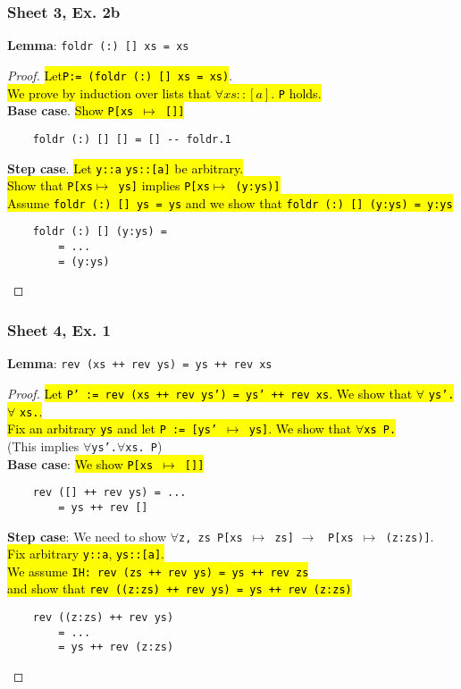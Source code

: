 \documentclass[12pt]{article}
\def\li{\rightarrow}
\begin{document}
\subsubsection{Sheet 3, Ex. 2b}
\textbf{Lemma}: \texttt{foldr (:) [] xs = xs}
\begin{proof}
    \hl{Let\texttt{P:= (foldr (:) [] xs = xs)}}. \\
    \hl{We prove by induction over lists that $\forall xs::[a].$ \texttt{P} holds.} \\
    \textbf{Base case}. \hl{Show \texttt{P[xs $\mapsto$ []]} }
    \begin{verbatim}
    foldr (:) [] [] = [] -- foldr.1
    \end{verbatim}
    \textbf{Step case}. \hl{Let \texttt{y::a} \texttt{ys::[a]} be arbitrary. \\
    Show that \texttt{P[xs$\mapsto$ ys]} implies \texttt{P[xs$\mapsto$ (y:ys)]} \\
    Assume \texttt{foldr (:) [] ys = ys} and we show that \texttt{foldr (:) [] (y:ys) = y:ys}}
    \begin{verbatim}
    foldr (:) [] (y:ys) = 
        = ...
        = (y:ys)
    \end{verbatim}
\end{proof}
\subsubsection{Sheet 4, Ex. 1}
\textbf{Lemma}: \texttt{rev (xs ++ rev ys) = ys ++ rev xs}
\begin{proof}
    \hl{Let \texttt{P' := rev (xs ++ rev ys') = ys' ++ rev xs}. 
    We show that $\forall$ \texttt{ys'.}$\forall$ \texttt{xs.}. \\
    Fix an arbitrary \texttt{ys} and let \texttt{P := [ys' $\mapsto$ ys]}.
    We show that $\forall$\texttt{xs P.} }\\
    (This implies $\forall$\texttt{ys'.}$\forall$\texttt{xs. P}) \\
    \textbf{Base case}: \hl{We show \texttt{P[xs $\mapsto$ []]} }
    \begin{verbatim}
    rev ([] ++ rev ys) = ...
        = ys ++ rev []
    \end{verbatim}
    \textbf{Step case}: We need to show 
    $\forall$\texttt{z, zs P[xs $\mapsto$ zs]} $\li$ \texttt{ P[xs $\mapsto$ (z:zs)]}.\\
    \hl{Fix arbitrary \texttt{y::a}, \texttt{ys::[a]}. \\
    We assume \texttt{IH: rev (zs ++ rev ys) = ys ++ rev zs} \\
    and show that \texttt{rev ((z:zs) ++ rev ys) = ys ++ rev (z:zs)}
    }
    \begin{verbatim}
    rev ((z:zs) ++ rev ys)
        = ...
        = ys ++ rev (z:zs)
    \end{verbatim}
\end{proof}
\end{document}
